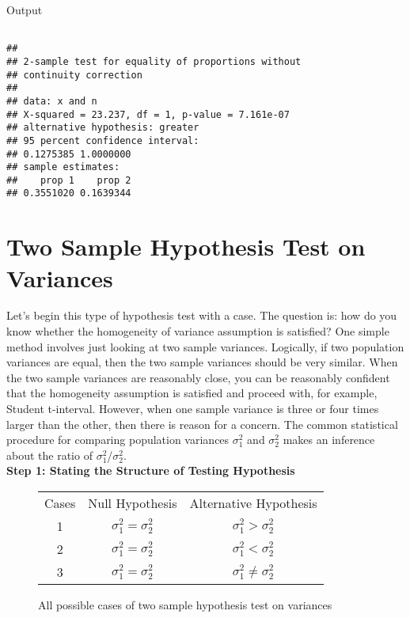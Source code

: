 \begin{example}
Output
\begin{tcolorbox}[colback=gray!10, colframe=gray!50, arc=2mm]
\begin{verbatim}

## 
## 2-sample test for equality of proportions without 
## continuity correction 
## 
## data: x and n
## X-squared = 23.237, df = 1, p-value = 7.161e-07
## alternative hypothesis: greater 
## 95 percent confidence interval: 
## 0.1275385 1.0000000 
## sample estimates:
##    prop 1    prop 2 
## 0.3551020 0.1639344

\end{verbatim}
\end{tcolorbox}

\end{example}

\section{Two Sample Hypothesis Test on Variances}

Let's begin this type of hypothesis test with a case. The question is: how do you know whether the homogeneity of variance assumption is satisﬁed? One simple method involves just looking at two sample variances. Logically, if two population variances are equal, then the two sample variances should be very similar. When the two sample variances are reasonably close, you can be reasonably conﬁdent that the homogeneity assumption is satisﬁed and proceed with, for example, Student t-interval. However, when one sample variance is three or four times larger than the other, then there is reason for a concern. The common statistical procedure for comparing population variances $\sigma_1^2$ and $\sigma_2^2$ makes an inference about the ratio of $\sigma_1^2$/$\sigma_2^2$.\\

\textbf{Step 1: Stating the Structure of Testing Hypothesis}

\begin{center}
\begin{figure}[H]
\centering
\begin{tabular}{ c c c }
Cases & Null Hypothesis & Alternative Hypothesis \\
     1	   & $\sigma_1^2 = \sigma_2^2$ & $\sigma_1^2 > \sigma_2^2$ \\
     2	   & $\sigma_1^2 = \sigma_2^2$ & $\sigma_1^2 < \sigma_2^2$ \\
     3    & $\sigma_1^2 = \sigma_2^2$ & $\sigma_1^2 \neq \sigma_2^2$ \\
\end{tabular}
\caption{All possible cases of two sample hypothesis test on variances}
\end{figure}
\end{center}
\vspace{-0.75cm}

